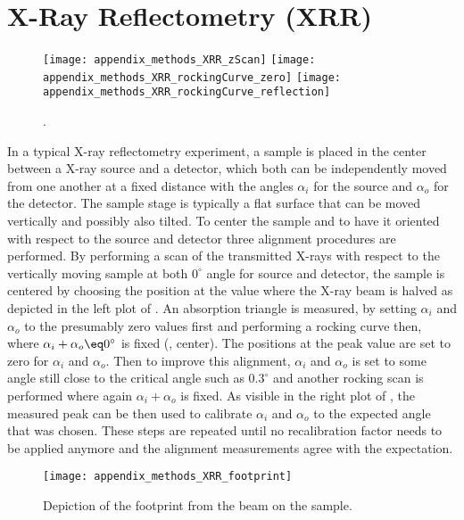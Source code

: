 \documentclass[\main/dresen_thesis.tex]{subfiles}
\begin{document}
  \section{X-Ray Reflectometry (XRR)}
    \label{ch:methods:xrr}
    \begin{figure}[tb]
      \centering
      \texttt{[image: appendix\_methods\_XRR\_zScan]}
      \texttt{[image: appendix\_methods\_XRR\_rockingCurve\_zero]}
      \texttt{[image: appendix\_methods\_XRR\_rockingCurve\_reflection]}
      \caption{\label{fig:methods:xrr:alignment}.}
    \end{figure}

    In a typical X-ray reflectometry experiment, a sample is placed in the center between a X-ray source and a detector, which both can be independently moved from one another at a fixed distance with the angles $\alpha_i$ for the source and $\alpha_o$ for the detector.
    The sample stage is typically a flat surface that can be moved vertically and possibly also tilted.
    To center the sample and to have it oriented with respect to the source and detector three alignment procedures are performed.
    By performing a scan of the transmitted X-rays with respect to the vertically moving sample at both $0^\circ$ angle for source and detector, the sample is centered by choosing the position at the value where the X-ray beam is halved as depicted in the left plot of .
    An absorption triangle is measured, by setting $\alpha_i$ and $\alpha_o$ to the presumably zero values first and performing a rocking curve then, where $\alpha_i + \alpha_o \eq 0^\circ$ is fixed (, center).
    The positions at the peak value are set to zero for $\alpha_i$ and $\alpha_o$.
    Then to improve this alignment, $\alpha_i$ and $\alpha_o$ is set to some angle still close to the critical angle such as $0.3^\circ$ and another rocking scan is performed where again $\alpha_i + \alpha_o$ is fixed.
    As visible in the right plot of , the measured peak can be then used to calibrate $\alpha_i$ and $\alpha_o$ to the expected angle that was chosen.
    These steps are repeated until no recalibration factor needs to be applied anymore and the alignment measurements agree with the expectation.

    \begin{figure}[tb]
      \centering
      \texttt{[image: appendix\_methods\_XRR\_footprint]}
      \caption{\label{fig:methods:xrr:footprint}Depiction of the footprint from the beam on the sample.}
    \end{figure}
\end{document}
